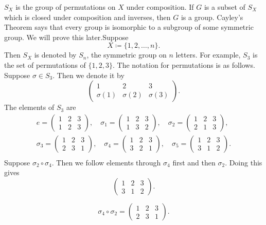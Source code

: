 $S_X$ is the group of permutations on $X$ under composition.
If $G$ is a subset of $S_X$ which is closed under composition and inverses, then $G$ is a group.
Cayley's Theorem says that every group is isomorphic to a subgroup of some symmetric group.
We will prove this later.Suppose
\[
    X\coloneqq \{1,2,\dots,n\}.
\]
Then $S_X$ is denoted by $S_n$, the symmetric group on $n$ letters.
For example, $S_3$ is the set of permutations of $\{1,2,3\}$.
The notation for permutations is as follows.
Suppose $\sigma\in S_3$.
Then we denote it by
\[
    \begin{pmatrix}
        1&2&3\\
        \sigma(1)&\sigma(2)&\sigma(3)
    \end{pmatrix}.
\]
The elements of $S_3$ are
\begin{gather*}
    e=
    \begin{pmatrix}
        1&2&3\\
        1&2&3
    \end{pmatrix},
    \quad
    \sigma_1=
    \begin{pmatrix}
        1&2&3\\
        1&3&2
    \end{pmatrix},
    \quad
    \sigma_2=
    \begin{pmatrix}
        1&2&3\\
        2&1&3
    \end{pmatrix},\\
    \sigma_3=
    \begin{pmatrix}
        1&2&3\\
        2&3&1
    \end{pmatrix},
    \quad
    \sigma_4=
    \begin{pmatrix}
        1&2&3\\
        3&2&1
    \end{pmatrix},
    \quad
    \sigma_5=
    \begin{pmatrix}
        1&2&3\\
        3&1&2
    \end{pmatrix}.\\
\end{gather*}
Suppose $\sigma_2\circ \sigma_4$.
Then we follow elements through $\sigma_4$ first and then $\sigma_2$.
Doing this gives
\[
    \begin{pmatrix}
        1&2&3\\
        3&1&2
    \end{pmatrix}.
\]
\begin{example}
    \[
        \sigma_4\circ \sigma_2 =
        \begin{pmatrix}
            1&2&3\\
            2&3&1
        \end{pmatrix}.
    \]
\end{example}

